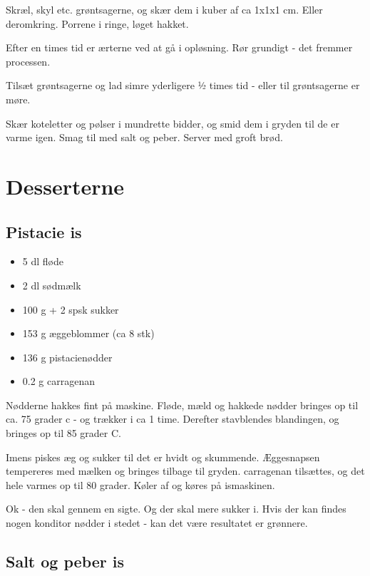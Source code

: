 \documentclass[
  letterpaper,
  DIV=11,
  numbers=noendperiod]{scrreprt}
\providecommand{\tightlist}{%
  \setlength{\itemsep}{0pt}\setlength{\parskip}{0pt}}\usepackage{longtable,booktabs,array}
\begin{document}
Skræl, skyl etc. grøntsagerne, og skær dem i kuber af ca 1x1x1 cm. Eller
deromkring. Porrene i ringe, løget hakket.

Efter en times tid er ærterne ved at gå i opløsning. Rør grundigt - det
fremmer processen.

Tilsæt grøntsagerne og lad simre yderligere ½ times tid - eller til
grøntsagerne er møre.

Skær koteletter og pølser i mundrette bidder, og smid dem i gryden til
de er varme igen. Smag til med salt og peber. Server med groft brød.


\hypertarget{desserterne}{%
\chapter{Desserterne}\label{desserterne}}

\hypertarget{pistacie-is}{%
\section{Pistacie is}\label{pistacie-is}}

\begin{itemize}
\tightlist
\item
  5 dl fløde
\item
  2 dl sødmælk
\item
  100 g + 2 spsk sukker
\item
  153 g æggeblommer (ca 8 stk)
\item
  136 g pistacienødder
\item
  0.2 g carragenan
\end{itemize}

Nødderne hakkes fint på maskine. Fløde, mæld og hakkede nødder bringes
op til ca. 75 grader c - og trækker i ca 1 time. Derefter stavblendes
blandingen, og bringes op til 85 grader C.

Imens piskes æg og sukker til det er hvidt og skummende. Æggesnapsen
tempereres med mælken og bringes tilbage til gryden. carragenan
tilsættes, og det hele varmes op til 80 grader. Køler af og køres på
ismaskinen.

Ok - den skal gennem en sigte. Og der skal mere sukker i. Hvis der kan
findes nogen konditor nødder i stedet - kan det være resultatet er
grønnere.

\hypertarget{salt-og-peber-is}{%
\section{Salt og peber is}\label{salt-og-peber-is}}
\end{document}
